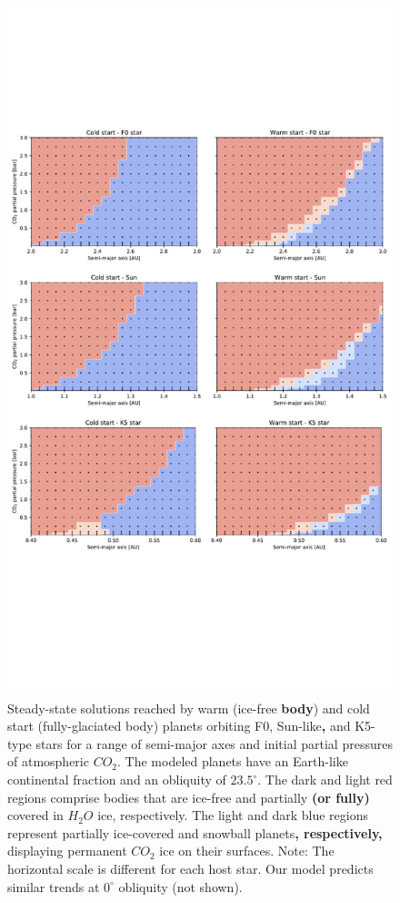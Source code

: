 \documentclass[fleqn,usenatbib]{mnras}
\providecommand{\DIFadd}[1]{{\bf #1}} %
\providecommand{\DIFdel}[1]{} %
\providecommand{\DIFaddend}{} %
\providecommand{\DIFaddFL}[1]{\DIFadd{#1}} %
\providecommand{\DIFdelFL}[1]{\DIFdel{#1}} %
\providecommand{\DIFaddbeginFL}{} %
\providecommand{\DIFaddendFL}{} %
\providecommand{\DIFdelbeginFL}{} %
\providecommand{\DIFdelendFL}{} %
\newcommand{\DIFscaledelfig}{0.5}
\newlength{\DIFdelgraphicswidth} %
\newlength{\DIFdelgraphicsheight} %
\newcommand{\DIFaddincludegraphics}[2][]{{\color{blue}\fbox{\DIFOincludegraphics[#1]{#2}}}} %
\newcommand{\DIFdelincludegraphics}[2][]{%
\sbox{\DIFdelgraphicsbox}{\DIFOincludegraphics[#1]{#2}}%
\settoboxwidth{\DIFdelgraphicswidth}{\DIFdelgraphicsbox} %
\settoboxtotalheight{\DIFdelgraphicsheight}{\DIFdelgraphicsbox} %
\scalebox{\DIFscaledelfig}{%
\parbox[b]{\DIFdelgraphicswidth}{\usebox{\DIFdelgraphicsbox}\\[-\baselineskip] \rule{\DIFdelgraphicswidth}{0em}}\llap{\resizebox{\DIFdelgraphicswidth}{\DIFdelgraphicsheight}{%
\setlength{\unitlength}{\DIFdelgraphicswidth}%
\begin{picture}(1,1)%
\thicklines\linethickness{2pt} %
{\color[rgb]{1,0,0}\put(0,0){\framebox(1,1){}}}%
{\color[rgb]{1,0,0}\put(0,0){\line( 1,1){1}}}%
{\color[rgb]{1,0,0}\put(0,1){\line(1,-1){1}}}%
\end{picture}%
}\hspace*{3pt}}} %
} %
\DeclareRobustCommand{\DIFaddend}{\DIFOaddend \let\includegraphics\DIFOincludegraphics} %
\DeclareRobustCommand{\DIFaddbeginFL}{\DIFOaddbeginFL \let\includegraphics\DIFaddincludegraphics} %
\DeclareRobustCommand{\DIFaddendFL}{\DIFOaddendFL \let\includegraphics\DIFOincludegraphics} %
\DeclareRobustCommand{\DIFdelbeginFL}{\DIFOdelbeginFL \let\includegraphics\DIFdelincludegraphics} %
\DeclareRobustCommand{\DIFdelendFL}{\DIFOaddendFL \let\includegraphics\DIFOincludegraphics} %
\begin{document}
\DIFaddend \begin{figure}
	\includegraphics[width=\textwidth]{Figures/Steady_state_all.pdf}
    \caption{Steady-state solutions reached by warm (ice-free \DIFaddbeginFL \DIFaddFL{body}\DIFaddendFL ) and cold start (fully-glaciated body) planets orbiting F0, Sun-like\DIFaddbeginFL \DIFaddFL{, }\DIFaddendFL and K5-type stars for a range of semi-major axes and initial partial pressures of atmospheric $CO_{\mathrm{2}}$. The modeled planets have an Earth-like continental fraction and an obliquity of $23.5^{\circ}$. The dark and light red regions comprise bodies that are ice-free and partially \DIFaddbeginFL \DIFaddFL{(or fully) }\DIFaddendFL covered in $H_{\mathrm{2}}O$ ice, respectively. The light and dark blue regions represent partially ice-covered and snowball planets\DIFaddbeginFL \DIFaddFL{, respectively, }\DIFaddendFL displaying permanent $CO_{\mathrm{2}}$ ice on their surfaces\DIFdelbeginFL \DIFdelFL{, respectively}\DIFdelendFL . Note: The horizontal scale is different for each host star. Our model predicts similar trends at $0^{\circ}$ obliquity (not shown).} 
    \label{fig:ss_all}
\end{figure}
\end{document}
